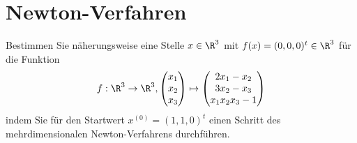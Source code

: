 \newpage
\section{Newton-Verfahren}
Bestimmen Sie näherungsweise eine Stelle $x \in \R^3$ mit $f(x)=(0,0,0)^t \in \R^3$ für die Funktion
$$
f: \R^3 \to \R^3, \begin{pmatrix} x_1 \\ x_2 \\x_3\end{pmatrix} \mapsto \begin{pmatrix} 2x_1-x_2 \\ 3x_2-x_3 \\ x_1x_2x_3-1 \end{pmatrix}
$$
indem Sie für den Startwert $x^{(0)}=(1,1,0)^t$ einen Schritt des mehrdimensionalen Newton-Verfahrens durchführen.


